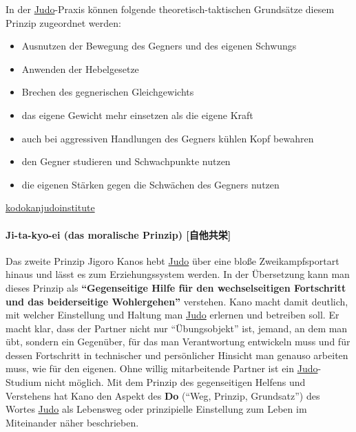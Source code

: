 \documentclass[justified, a4paper, notitlepage, captions=tableheading, nobib]{tufte-handout}
\begin{document}
In der \hyperref[org6f56467]{Judo}-Praxis können folgende theoretisch-taktischen Grundsätze diesem Prinzip zugeordnet werden: 
\begin{itemize}
\item Ausnutzen der Bewegung des Gegners und des eigenen Schwungs
\item Anwenden der Hebelgesetze
\item Brechen des gegnerischen Gleichgewichts
\item das eigene Gewicht mehr einsetzen als die eigene Kraft
\item auch bei aggressiven Handlungen des Gegners kühlen Kopf bewahren
\item den Gegner studieren und Schwachpunkte nutzen
\item die eigenen Stärken gegen die Schwächen des Gegners nutzen
\end{itemize}

\href{http://kodokanjudoinstitute.org/en/doctrine/word/seiryoku-zenyo/}{kodokanjudoinstitute}

\paragraph{\label{org11da039}Ji-ta-kyo-ei (das moralische Prinzip) [自他共栄]}
\label{sec:orgb7790cc}
Das zweite Prinzip Jigoro Kanos hebt \hyperref[org6f56467]{Judo} über eine bloße Zweikampfsportart hinaus und lässt es zum Erziehungssystem werden. In der Übersetzung kann man dieses Prinzip als \textbf{"`Gegenseitige Hilfe für den wechselseitigen Fortschritt und das beiderseitige Wohlergehen"'} verstehen. Kano macht damit deutlich, mit welcher Einstellung und Haltung man \hyperref[org6f56467]{Judo} erlernen und betreiben soll. Er macht klar, dass der Partner nicht nur "`Übungsobjekt"' ist, jemand, an dem man übt, sondern ein Gegenüber, für das man Verantwortung entwickeln muss und für dessen Fortschritt in technischer und persönlicher Hinsicht man genauso arbeiten muss, wie für den eigenen. Ohne willig mitarbeitende Partner ist ein \hyperref[org6f56467]{Judo}-Studium nicht möglich. Mit dem Prinzip des gegenseitigen Helfens und Verstehens hat Kano den Aspekt des \textbf{Do} ("`Weg, Prinzip, Grundsatz"') des Wortes \hyperref[org6f56467]{Judo} als Lebensweg oder prinzipielle Einstellung zum Leben im Miteinander näher beschrieben. 
\end{document}
